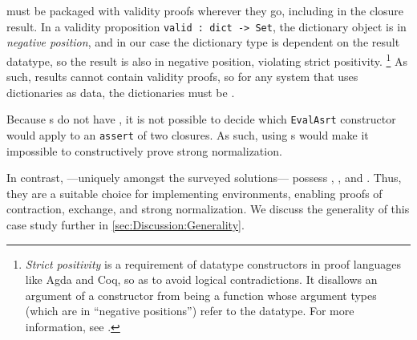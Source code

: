 \Cals{} must be packaged with validity proofs wherever they go, including in the closure result.
In a validity proposition \texttt{valid : dict -> Set},
%
%
the dictionary object is in \emph{negative position},
and in our case the dictionary type is dependent on the result datatype,
so the result is also in negative position, violating strict positivity.%
\footnote{
\emph{Strict positivity} is a requirement of datatype constructors in proof languages like Agda and Coq, so as to avoid logical contradictions.
%
It disallows an argument of a constructor from being a function whose argument types (which are in ``negative positions'') refer to the datatype.
%
For more information, see \citep{positivity}.
}
As such, results cannot contain validity proofs, so for any system that uses dictionaries as data,
the dictionaries must be \semanticallyTotal.

Because \fpf{}s do not have \EqDec, it is not possible to decide which \texttt{EvalAsrt} constructor would
apply to an \texttt{assert} of two closures. As such, using \fpf{}s would make it impossible to constructively prove strong normalization.

In contrast, \dds{} ---uniquely amongst the surveyed solutions--- possess \SemTot, \SemInj, and \EqDec.
%
Thus, they are a suitable choice for implementing environments, enabling proofs of contraction, exchange, and strong normalization.
%
We discuss the generality of this case study further in \autoref{sec:Discussion:Generality}.

